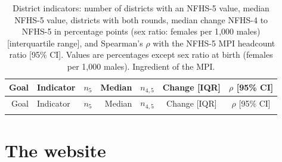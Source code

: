 \documentclass[11pt,a4paper]{article}
\begin{document}
{\small
\setlength{\tabcolsep}{4pt}
\begin{longtable}{r>{\raggedright\arraybackslash}p{4.9cm}rrrcc}
\caption{District indicators: number of districts with an NFHS-5 value, median NFHS-5 value, districts with both rounds, median change NFHS-4 to NFHS-5 in percentage points (sex ratio: females per 1{,}000 males) [interquartile range], and Spearman's $\rho$ with the NFHS-5 MPI headcount ratio [95\% CI]. Values are percentages except sex ratio at birth (females per 1{,}000 males). \textdagger{} Ingredient of the MPI.}\label{tab:assoc}\\
\toprule
Goal & Indicator & $n_5$ & Median & $n_{4,5}$ & Change [IQR] & $\rho$ [95\% CI] \\
\midrule
\endfirsthead
\toprule
Goal & Indicator & $n_5$ & Median & $n_{4,5}$ & Change [IQR] & $\rho$ [95\% CI] \\
\midrule
\endhead
\bottomrule
\endfoot
{}{tab_assoc.tex}
\end{longtable}
}

\section{The website}\label{sec:web}
\end{document}
